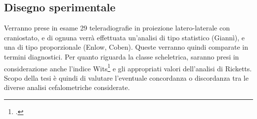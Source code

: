 \subsection{Disegno sperimentale}
Verranno prese in esame 29 teleradiografie in proiezione latero-laterale con craniostato, e di ognuna verrà effettuata un'analisi di tipo statistico (Giannì), e una di tipo proporzionale (Enlow, Coben). Queste verranno quindi comparate in termini diagnostici. Per quanto riguarda la classe scheletrica, saranno presi in considerazione anche l'indice Wits\footcite{Jacobson1975} e gli appropriati valori dell'analisi di Ricketts. Scopo della tesi è quindi di valutare l'eventuale concordanza o discordanza tra le diverse analisi cefalometriche considerate.
